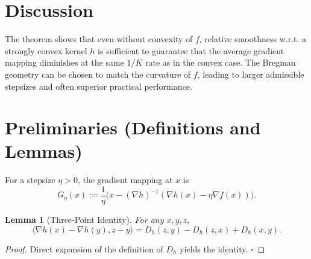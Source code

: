 \documentclass{article}
\newtheorem{lemma}{Lemma}
\newcommand{\inner}[2]{\langle #1,#2\rangle}
\newcommand{\Breg}[2]{D_h(#1,#2)}
\newcommand{\grad}[1]{\nabla #1}
\begin{document}
\section*{Discussion}
The theorem shows that even without convexity of $f$, relative smoothness w.r.t. a strongly convex kernel $h$ is sufficient to guarantee that the average gradient mapping diminishes at the same $1/K$ rate as in the convex case. The Bregman geometry can be chosen to match the curvature of $f$, leading to larger admissible stepsizes and often superior practical performance.

\newpage
\section*{Preliminaries (Definitions and Lemmas)}
\begin{definition}
For a stepsize $\eta>0$, the gradient mapping at $x$ is
\[
G_{\eta}(x):=\frac{1}{\eta}\bigl(x-(\grad{h})^{-1}(\grad{h}(x)-\eta\grad{f}(x))\bigr).
\]
\end{definition}

\begin{lemma}[Three‑Point Identity]\label{lem:3pt}
For any $x,y,z$,
\[
\inner{\grad{h}(x)-\grad{h}(y)}{z-y}= \Breg{z}{y}-\Breg{z}{x}+\Breg{x}{y}.
\]
\end{lemma}
\begin{proof}
Direct expansion of the definition of $D_h$ yields the identity. \hfill $\square$
\end{proof}
\end{document}
